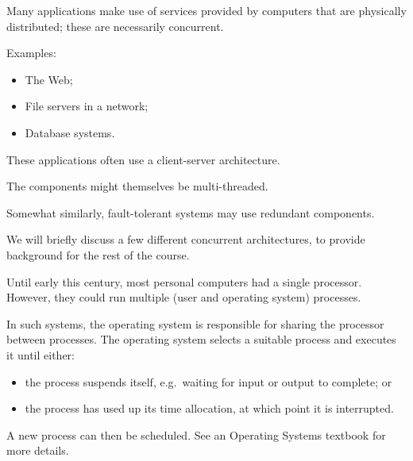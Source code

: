 \documentclass[notes,color]{sepslide0}
\begin{document}
\begin{slide}

Many applications make use of services provided by computers that are
physically distributed; these are necessarily concurrent.

Examples:
%
\begin{itemize}
\item 
The Web;

\item
File servers in a network;

\item
Database systems.
\end{itemize}

These applications often use a client-server architecture.

The components might themselves be multi-threaded.

Somewhat similarly, fault-tolerant systems may use redundant components.
\end{slide}


\begin{slide}

We will briefly discuss a few different concurrent architectures, to provide
background for the rest of the course.
\end{slide}


\begin{slide}

Until early this century, most personal computers had a single processor.
However, they could run multiple (user and operating system) processes.

In such systems, the operating system is responsible for sharing the processor
between processes.  The operating system selects a suitable process and
executes it until either:
\begin{itemize}
\item
the process suspends itself, e.g.~waiting for input or output to complete; or

\item
the process has used up its time allocation, at which point it is interrupted.
\end{itemize}
%
A new process can then be scheduled.  See an Operating Systems textbook for
more details.
\end{slide}
\end{document}
